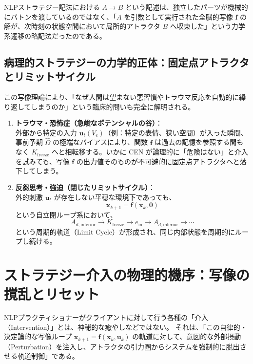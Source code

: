 NLPストラテジー記法における $A \longrightarrow B$ という記述は、独立したパーツが機械的にバトンを渡しているのではなく、「$A$ を引数として実行された全脳的写像 $\boldsymbol{f}$ の解が、次時刻の状態空間において局所的アトラクタ $B$ へ収束した」という力学系遷移の略記法だったのである。

\subsection{病理的ストラテジーの力学的正体：固定点アトラクタとリミットサイクル}
この写像理論により、「なぜ人間は望まない悪習慣やトラウマ反応を自動的に繰り返してしまうのか」という臨床的問いも完全に解明される。

\begin{enumerate}
    \item \textbf{トラウマ・恐怖症（急峻なポテンシャルの谷）}：\\
    外部から特定の入力 $\boldsymbol{u}_t(V_e)$（例：特定の表情、狭い空間）が入った瞬間、事前予期 $\hat{\Omega}$ の極端なバイアスにより、関数 $\boldsymbol{f}$ は過去の記憶を参照する間もなく $K_{\mathrm{freeze}}$ へと相転移する。いかに CEN が論理的に「危険はない」と介入を試みても、写像 $\boldsymbol{f}$ の出力値そのものが不可避的に固定点アトラクタへと落下してしまう。
    
    \item \textbf{反芻思考・強迫（閉じたリミットサイクル）}：\\
    外的刺激 $\boldsymbol{u}_t$ が存在しない平穏な環境下であっても、
    \begin{equation}
        \boldsymbol{x}_{k+1} = \boldsymbol{f}(\boldsymbol{x}_k, \boldsymbol{0})
    \end{equation}
    という自立閉ループ系において、
    \begin{equation}
        A_{d,\mathrm{inferior}} \longrightarrow K_{\mathrm{freeze}} \longrightarrow e_{\mathrm{in}} \longrightarrow A_{d,\mathrm{inferior}} \longrightarrow \cdots
    \end{equation}
    という周期的軌道（Limit Cycle）が形成され、同じ内部状態を周期的にループし続ける。
\end{enumerate}

\section{ストラテジー介入の物理的機序：写像の撹乱とリセット}

NLPプラクティショナーがクライアントに対して行う各種の「介入（Intervention）」とは、神秘的な癒やしなどではない。
それは、「この自律的・決定論的な写像ループ $\boldsymbol{x}_{k+1} = \boldsymbol{f}(\boldsymbol{x}_k, \boldsymbol{u}_k)$ の軌道に対して、意図的な外部摂動（Perturbation）を注入し、アトラクタの引力圏からシステムを強制的に脱出させる軌道制御」である。

